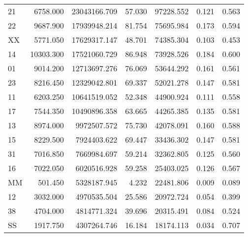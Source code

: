 \begin{tabular}{lrrrrrr}
          21 &        6758.000 &     23043166.709 &      57.030 &            97228.552 &        0.121 &                 0.563 \\
          22 &        9687.900 &     17939948.214 &      81.754 &            75695.984 &        0.173 &                 0.594 \\
          XX &        5771.050 &     17629317.147 &      48.701 &            74385.304 &        0.103 &                 0.453 \\
          14 &       10303.300 &     17521060.729 &      86.948 &            73928.526 &        0.184 &                 0.600 \\
          01 &        9014.200 &     12713697.276 &      76.069 &            53644.292 &        0.161 &                 0.561 \\
          23 &        8216.450 &     12329042.801 &      69.337 &            52021.278 &        0.147 &                 0.581 \\
          11 &        6203.250 &     10641519.052 &      52.348 &            44900.924 &        0.111 &                 0.558 \\
          17 &        7544.350 &     10490896.358 &      63.665 &            44265.385 &        0.135 &                 0.581 \\
          13 &        8974.000 &      9972507.572 &      75.730 &            42078.091 &        0.160 &                 0.588 \\
          15 &        8229.500 &      7924403.622 &      69.447 &            33436.302 &        0.147 &                 0.581 \\
          31 &        7016.850 &      7669984.697 &      59.214 &            32362.805 &        0.125 &                 0.560 \\
          16 &        7022.050 &      6020516.928 &      59.258 &            25403.025 &        0.126 &                 0.567 \\
          MM &         501.450 &      5328187.945 &       4.232 &            22481.806 &        0.009 &                 0.089 \\
          12 &        3032.000 &      4970535.504 &      25.586 &            20972.724 &        0.054 &                 0.399 \\
          38 &        4704.000 &      4814771.324 &      39.696 &            20315.491 &        0.084 &                 0.524 \\
          SS &        1917.750 &      4307264.746 &      16.184 &            18174.113 &        0.034 &                 0.707 \\

\end{tabular}
